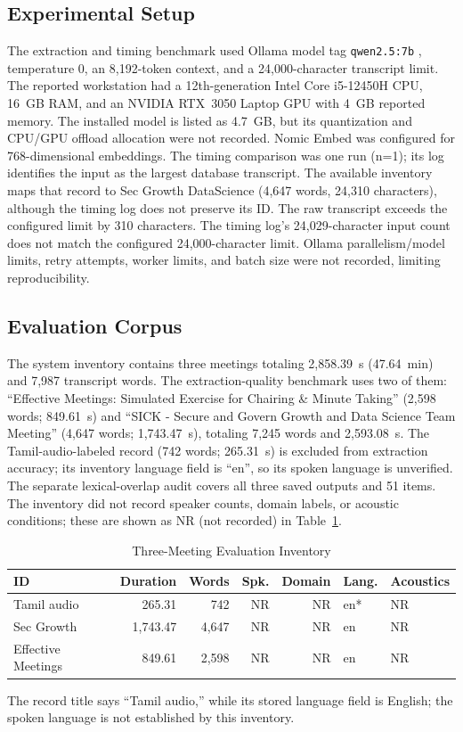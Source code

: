 \documentclass[conference]{IEEEtran}
\begin{document}
\subsection{Experimental Setup}
The extraction and timing benchmark used Ollama model tag \texttt{qwen2.5:7b} \cite{qwen25}, temperature 0, an 8,192-token context, and a 24,000-character transcript limit. The reported workstation had a 12th-generation Intel Core i5-12450H CPU, 16~GB RAM, and an NVIDIA RTX~3050 Laptop GPU with 4~GB reported memory. The installed model is listed as 4.7~GB, but its quantization and CPU/GPU offload allocation were not recorded. Nomic Embed \cite{nomic} was configured for 768-dimensional embeddings. The timing comparison was one run (n=1); its log identifies the input as the largest database transcript. The available inventory maps that record to Sec Growth DataScience (4,647 words, 24,310 characters), although the timing log does not preserve its ID. The raw transcript exceeds the configured limit by 310 characters. The timing log's 24,029-character input count does not match the configured 24,000-character limit. Ollama parallelism/model limits, retry attempts, worker limits, and batch size were not recorded, limiting reproducibility.

\subsection{Evaluation Corpus}
The system inventory contains three meetings totaling 2,858.39~s (47.64~min) and 7,987 transcript words. The extraction-quality benchmark uses two of them: ``Effective Meetings: Simulated Exercise for Chairing & Minute Taking'' (2,598 words; 849.61~s) and ``SICK - Secure and Govern Growth and Data Science Team Meeting'' (4,647 words; 1,743.47~s), totaling 7,245 words and 2,593.08~s. The Tamil-audio-labeled record (742 words; 265.31~s) is excluded from extraction accuracy; its inventory language field is ``en'', so its spoken language is unverified. The separate lexical-overlap audit covers all three saved outputs and 51 items. The inventory did not record speaker counts, domain labels, or acoustic conditions; these are shown as NR (not recorded) in Table~\ref{tab:corpus}.

\begin{table}[t]
\caption{Three-Meeting Evaluation Inventory}
\label{tab:corpus}
\centering
\scriptsize
\begin{tabular}{@{}lrrrrll@{}}
\toprule
\textbf{ID} & \textbf{Duration} & \textbf{Words} & \textbf{Spk.} & \textbf{Domain} & \textbf{Lang.} & \textbf{Acoustics} \\
\midrule
Tamil audio & 265.31 & 742 & NR & NR & en* & NR \\
Sec Growth & 1,743.47 & 4,647 & NR & NR & en & NR \\
Effective Meetings & 849.61 & 2,598 & NR & NR & en & NR \\
\bottomrule
\end{tabular}
\end{table}
\par\noindent *The record title says ``Tamil audio,'' while its stored language field is English; the spoken language is not established by this inventory.
\end{document}
